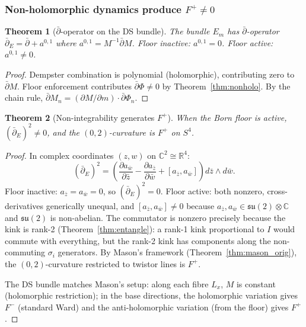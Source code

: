 \documentclass[11pt,a4paper]{article}
\newtheorem{theorem}{Theorem}[section]
\theoremstyle{definition}
\theoremstyle{remark}
\newcommand{\C}{\mathbb{C}}
\newcommand{\R}{\mathbb{R}}
\newcommand{\dbar}{\bar{\partial}}
\newcommand{\su}{\mathfrak{su}}
\begin{document}
\subsubsection{Non-holomorphic dynamics produce $F^+\neq 0$}

\begin{theorem}[$\dbar$-operator on the DS bundle]\label{thm:dbar}
The bundle $E_m$ has $\dbar$-operator $\dbar_E=\dbar+a^{0,1}$ where $a^{0,1}=M^{-1}\dbar M$. Floor inactive: $a^{0,1}=0$. Floor active: $a^{0,1}\neq 0$.
\end{theorem}

\begin{proof}
Dempster combination is polynomial (holomorphic), contributing zero to $\dbar M$. Floor enforcement contributes $\dbar\Phi\neq 0$ by Theorem~\ref{thm:nonholo}. By the chain rule, $\dbar M_n=(\partial M/\partial m)\cdot\dbar\Phi_n$.
\end{proof}

\begin{theorem}[Non-integrability generates $F^+$]\label{thm:nijenhuis}
When the Born floor is active, $(\dbar_E)^2\neq 0$, and the $(0,2)$-curvature is $F^+$ on $S^4$.
\end{theorem}

\begin{proof}
In complex coordinates $(z,w)$ on $\C^2\cong\R^4$:
\begin{equation}
(\dbar_E)^2=\left(\frac{\partial a_{\bar{w}}}{\partial\bar{z}}-\frac{\partial a_{\bar{z}}}{\partial\bar{w}}+[a_{\bar{z}},a_{\bar{w}}]\right)d\bar{z}\wedge d\bar{w}.
\end{equation}
Floor inactive: $a_{\bar{z}}=a_{\bar{w}}=0$, so $(\dbar_E)^2=0$. Floor active: both nonzero, cross-derivatives generically unequal, and $[a_{\bar{z}},a_{\bar{w}}]\neq 0$ because $a_{\bar{z}},a_{\bar{w}}\in\su(2)\otimes\C$ and $\su(2)$ is non-abelian. The commutator is nonzero precisely because the kink is rank-2 (Theorem~\ref{thm:entangle}): a rank-1 kink proportional to $I$ would commute with everything, but the rank-2 kink has components along the non-commuting $\sigma_i$ generators. By Mason's framework (Theorem~\ref{thm:mason_orig}), the $(0,2)$-curvature restricted to twistor lines is $F^+$.

The DS bundle matches Mason's setup: along each fibre $L_x$, $M$ is constant (holomorphic restriction); in the base directions, the holomorphic variation gives $F^-$ (standard Ward) and the anti-holomorphic variation (from the floor) gives $F^+$.
\end{proof}
\end{document}
